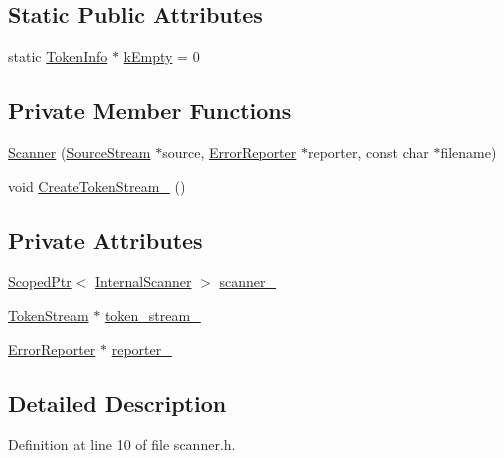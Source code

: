 \subsection*{Static Public Attributes}
\begin{DoxyCompactItemize}
\item 
static \hyperlink{classmocha_1_1_token_info}{TokenInfo} $\ast$ \hyperlink{classmocha_1_1_scanner_a68b535f6c558d75f7816a78ac2ffa5ec}{kEmpty} = 0
\end{DoxyCompactItemize}
\subsection*{Private Member Functions}
\begin{DoxyCompactItemize}
\item 
\hyperlink{classmocha_1_1_scanner_aab47365559518db8da80bbd5682274cc}{Scanner} (\hyperlink{classmocha_1_1_source_stream}{SourceStream} $\ast$source, \hyperlink{classmocha_1_1_error_reporter}{ErrorReporter} $\ast$reporter, const char $\ast$filename)
\item 
void \hyperlink{classmocha_1_1_scanner_af7396124d87a6b8d5ce69a849ef7c29c}{CreateTokenStream\_\-} ()
\end{DoxyCompactItemize}
\subsection*{Private Attributes}
\begin{DoxyCompactItemize}
\item 
\hyperlink{classmocha_1_1_scoped_ptr}{ScopedPtr}$<$ \hyperlink{classmocha_1_1_scanner_1_1_internal_scanner}{InternalScanner} $>$ \hyperlink{classmocha_1_1_scanner_a2ce71c6e214bb37d67b3c8c46288b798}{scanner\_\-}
\item 
\hyperlink{classmocha_1_1_token_stream}{TokenStream} $\ast$ \hyperlink{classmocha_1_1_scanner_ac9dd3a3420dcc112d63220f8392a34a5}{token\_\-stream\_\-}
\item 
\hyperlink{classmocha_1_1_error_reporter}{ErrorReporter} $\ast$ \hyperlink{classmocha_1_1_scanner_a1c6af992cd8b73384d55de119ba3f141}{reporter\_\-}
\end{DoxyCompactItemize}


\subsection{Detailed Description}


Definition at line 10 of file scanner.h.



